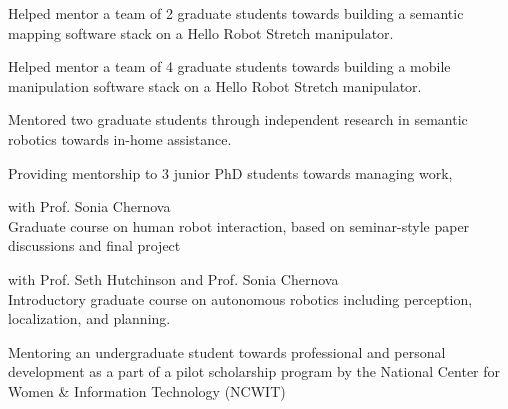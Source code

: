 

\begin{cventries}
{
\begin{cvitems}
    \item Helped mentor a team of 2 graduate students towards building a semantic mapping software stack on a Hello Robot Stretch manipulator.
    \item Helped mentor a team of 4 graduate students towards building a mobile manipulation software stack on a Hello Robot Stretch manipulator.
    \item Mentored two graduate students through independent research in semantic robotics towards in-home assistance.
\end{cvitems}
}

{
\begin{cvitems}
    \item Providing mentorship to 3 junior PhD students towards managing work, 
\end{cvitems}
}

{
\begin{cvitems}
    \item { with Prof. Sonia Chernova \hfill {}\\ 
    Graduate course on human robot interaction, based on seminar-style paper discussions and final project}
    \item { with Prof. Seth Hutchinson and Prof. Sonia Chernova \hfill {}\\ Introductory graduate course on autonomous robotics including perception, localization, and planning.}
\end{cvitems}
}

{
\begin{cvitems}
    \item Mentoring an undergraduate student towards professional and personal development as a part of a pilot scholarship program by the National Center for Women \& Information Technology (NCWIT)
\end{cvitems}
}


\end{cventries}
